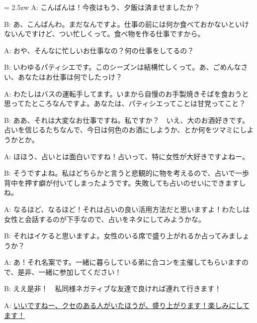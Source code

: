 \documentclass[11pt]{amsart}
\title{}
\author{}
\newenvironment{hangall}[1]{\hangindent = 2.5zw\everypar{\hangindent = 2.5zw}}{}
\begin{document}
\maketitle
\begin{hangall}{}%
A: こんばんは！今夜はもう、夕飯は済ませましたか？

B: あ、こんばんわ。まだなんですよ。仕事の前には何か食べておかないといけないんですけど、つい忙しくって。食べ物を作る仕事ですから。

A: おや、そんなに忙しいお仕事なの？何の仕事をしてるの？

B: いわゆるパティシエです。このシーズンは結構忙しくって。あ、ごめんなさい、あなたはお仕事は何でしたっけ？

A: わたしはバスの運転手してます。いまから自慢のお手製焼きそばを食おうと思ってたところなんですよ。あなたは、パティシエってことは甘党ってこと？

B: ああ、それは大変なお仕事ですね。私ですか？　いえ、大のお酒好きです。占いを信じるたちなんで、今日は何色のお酒にしようか、とか何をツマミにしようかとか。

A: ほほう、占いとは面白いですね！占いって、特に女性が大好きですよねー。

B: そうですよね。私はどちらかと言うと悲観的に物を考えるので、占いで一歩背中を押す癖が付いてしまったようです。失敗しても占いのせいにできますしね。

A: なるほど、なるほど！それは占いの良い活用方法だと思いますよ！わたしは女性と会話するのが下手なので、占いをネタにしてみようかな。

B: それはイケると思いますよ。女性のいる席で盛り上がれるか占ってみましょうか？

A: あ！それ名案です。一緒に暮らしている弟に合コンを主催してもらいますので、是非、一緒に参加してください！

B: ええ是非！　私同様ネガティブな友達で良ければ連れて行きます！

A: \ul{いいですねー、クセのある人がいたほうが、盛り上がります！楽しみにしてます！}\end{hangall}
\end{document}
